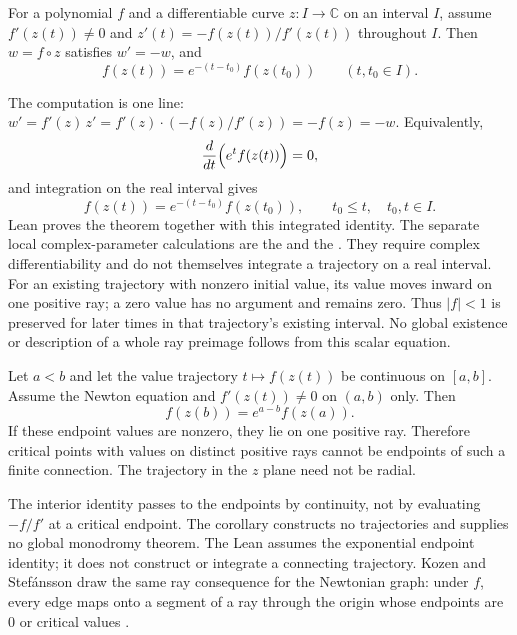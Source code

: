 \begin{theorem}\label{res:value}
For a polynomial $f$ and a differentiable curve $z:I\to\mathbb C$ on an
interval $I$, assume $f'(z(t))\ne0$ and
$z'(t)=-f(z(t))/f'(z(t))$ throughout $I$.  Then $w=f\circ z$ satisfies
$w'=-w$, and
\[
 f(z(t))=e^{-(t-t_0)}f(z(t_0))\qquad(t,t_0\in I).
\]
\end{theorem}

\noindent The computation is one line: $w'=f'(z)\,z'=f'(z)\cdot(-f(z)/f'(z))=-f(z)=-w$.
Equivalently,
\[
  \frac{d}{dt}\Bigl(e^{t}f(z(t))\Bigr)=0,
\]
and integration on the real interval gives
\[
  f(z(t))=e^{-(t-t_0)}f(z(t_0)),\qquad t_0\le t,\quad t_0,t\in I .
\]
Lean proves the theorem together with this integrated identity.
The separate local complex-parameter calculations are the
and the
.
They require complex differentiability and do not themselves integrate a
trajectory on a real interval.
For an existing trajectory with nonzero initial value, its value moves
inward on one positive ray; a zero value has no argument and remains zero.
Thus $|f|<1$ is preserved for later times in that trajectory's existing
interval. No global existence or description of a whole ray preimage follows
from this scalar equation.

\begin{corollary}\label{res:ray}
Let $a<b$ and let the value trajectory $t\mapsto f(z(t))$ be continuous on
$[a,b]$. Assume the Newton equation and $f'(z(t))\ne0$ on $(a,b)$ only.
Then
\[
 f(z(b))=e^{a-b}f(z(a)).
\]
If these endpoint values are nonzero, they lie on one positive ray. Therefore
critical points with values on distinct positive rays cannot be endpoints
of such a finite connection. The trajectory in the $z$ plane need not be radial.
\end{corollary}

\noindent The interior identity passes to the endpoints by continuity, not
by evaluating $-f/f'$ at a critical endpoint. The corollary constructs no
trajectories and supplies no global monodromy theorem.
The Lean 
assumes the exponential endpoint identity; it does not construct or
integrate a connecting trajectory.
Kozen and Stef\'ansson draw the same ray consequence for the Newtonian graph:
under $f$, every edge maps onto a segment of a ray through the origin whose
endpoints are $0$ or critical values \cite[\S2]{kozen-stefansson1997}.

